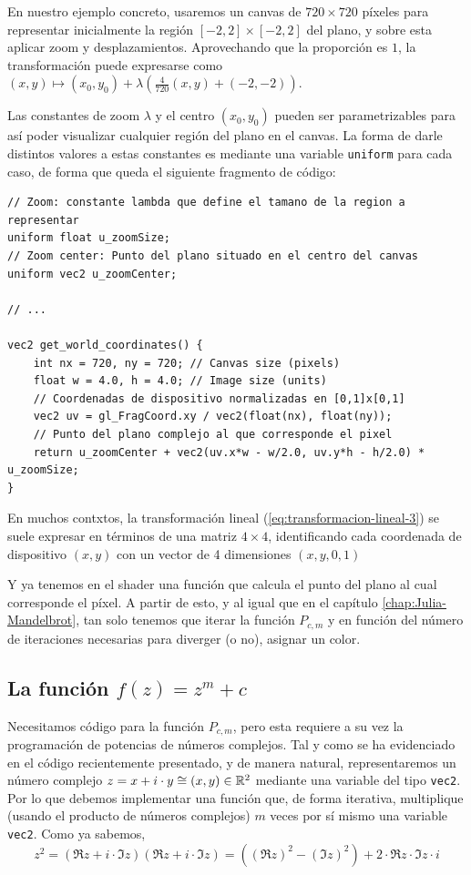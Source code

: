 En nuestro ejemplo concreto, usaremos un canvas de $720\times 720$ píxeles para representar inicialmente la región $[-2,2]\times[-2,2]$ del plano, y sobre esta aplicar zoom y desplazamientos. Aprovechando que la proporción es $1$, la transformación puede expresarse como $(x,y)\longmapsto(x_0,y_0)+\lambda\left(\frac{4}{720}(x,y) + (-2,-2)\right)$.

Las constantes de zoom $\lambda$ y el centro $(x_0,y_0)$ pueden ser parametrizables para así poder visualizar cualquier región del plano en el canvas. La forma de darle distintos valores a estas constantes es mediante una variable \verb|uniform| para cada caso, de forma que queda el siguiente fragmento de código:

\begin{lstlisting}
// Zoom: constante lambda que define el tamano de la region a representar
uniform float u_zoomSize;
// Zoom center: Punto del plano situado en el centro del canvas
uniform vec2 u_zoomCenter;

// ... 

vec2 get_world_coordinates() {
    int nx = 720, ny = 720; // Canvas size (pixels)
    float w = 4.0, h = 4.0; // Image size (units) 
    // Coordenadas de dispositivo normalizadas en [0,1]x[0,1]
    vec2 uv = gl_FragCoord.xy / vec2(float(nx), float(ny));
    // Punto del plano complejo al que corresponde el pixel
    return u_zoomCenter + vec2(uv.x*w - w/2.0, uv.y*h - h/2.0) * u_zoomSize;
}
\end{lstlisting}

En muchos contxtos, la transformación lineal (\ref{eq:transformacion-lineal-3}) se suele expresar en términos de una matriz $4\times 4$, identificando cada coordenada de dispositivo $(x,y)$ con un vector de 4 dimensiones $(x,y,0,1)$ 

Y ya tenemos en el shader una función que calcula el punto del plano al cual corresponde el píxel. A partir de esto, y al igual que en el capítulo \ref{chap:Julia-Mandelbrot}, tan solo tenemos que iterar la función $P_{c,m}$ y en función del número de iteraciones necesarias para diverger (o no), asignar un color.

\subsection{La función $f(z)=z^m+c$}

Necesitamos código para la función $P_{c,m}$, pero esta requiere a su vez la programación de potencias de números complejos. Tal y como se ha evidenciado en el código recientemente presentado, y de manera natural, representaremos un número complejo $z=x+i\cdot y\cong (x,y)\in\mathbb{R}^2$ mediante una variable del tipo \verb|vec2|. Por lo que debemos implementar una función que, de forma iterativa, multiplique (usando el producto de números complejos) $m$ veces por sí mismo una variable \verb|vec2|. Como ya sabemos,
$$
z^2 = (\Re z+i\cdot \Im z)(\Re z+i\cdot \Im z) = ((\Re z)^2-(\Im z)^2) + 2\cdot\Re z\cdot\Im z\cdot i
$$


